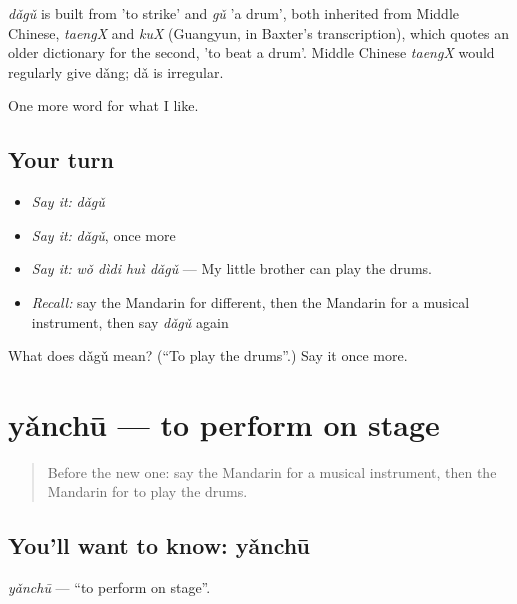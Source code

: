 \begin{cousinweb}
\emph{dǎgǔ} is built from  'to strike' and \emph{gǔ} 'a drum', both inherited from Middle Chinese, \emph{taengX} and \emph{kuX} (Guangyun, in Baxter's transcription), which quotes an older dictionary for the second, 'to beat a drum'. Middle Chinese \emph{taengX} would regularly give dǎng; dǎ is irregular.
\end{cousinweb}

\begin{grammarlens}[title={What you've built}]
One more word for what I like.
\end{grammarlens}

\subsection*{Your turn}
\begin{itemize}
\raggedright
  \item \emph{Say it:} \emph{dǎgǔ}
  \item \emph{Say it:} \emph{dǎgǔ}, once more
  \item \emph{Say it:} \emph{wǒ dìdi huì dǎgǔ} — My little brother can play the drums.
  \item \emph{Recall:} say the Mandarin for different, then the Mandarin for a musical instrument, then say \emph{dǎgǔ} again
\end{itemize}

\begin{tcolorbox}[breakable,colback=teal!4,colframe=teal!35!black,title={Before you move on}]
What does dǎgǔ mean? (\textquotedblleft{}To play the drums\textquotedblright{}.) Say it once more.
\end{tcolorbox}
\section[yǎnchū]{yǎnchū — to perform on stage}

\label{lesson:ZH-C257-yanchu}



\begin{quote}
Before the new one: say the Mandarin for a musical instrument, then the Mandarin for to play the drums.
\end{quote}

\subsection*{You'll want to know: yǎnchū}
\emph{yǎnchū} — \textquotedblleft{}to perform on stage\textquotedblright{}.

